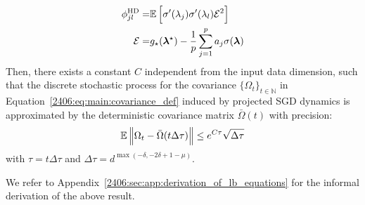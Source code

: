 \begin{proposition}
\begin{align*}
    \phi^{\rm{HD}}_{jl}=&\mathbb{E}\left[ \sigma'(\lambda_j)\sigma'(\lambda_l)\mathcal{E}^2  \right]  \\
    \mathcal{E} =& g_\star(\vec \lambda^\star) - \frac{1}{p} \sum_{j=1}^p a_j \sigma(\vec \lambda)
\end{align*}
Then, there exists a constant $C$ independent from the input data dimension, such that the discrete stochastic process for the covariance \(\{\Omega_t\}_{t\in\mathbb{N}}\) in Equation~\eqref{2406:eq:main:covariance_def} induced by projected SGD dynamics is approximated by the deterministic covariance matrix \(\bar\Omega(t)\) with precision:
\begin{equation}
\label{2406:eq:main:time_horizon}
    \mathbb{E} \norm{\Omega_t - \bar \Omega(t\Delta \tau)} \le e^{C\tau}\sqrt{\Delta \tau}
\end{equation}
with
    $\tau = t\Delta\tau$ and $\Delta \tau = d^{\max(-\delta,-2\delta+1-\mu)}$.
\end{proposition}
We refer to Appendix~\ref{2406:sec:app:derivation_of_lb_equations} for the informal derivation of the above result. 

